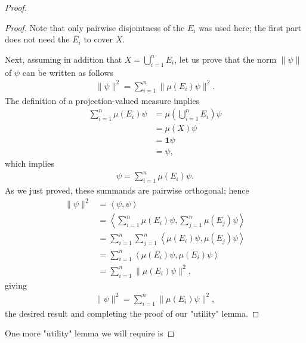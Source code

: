 \begin{proof}
\begin{proof}
Note that only pairwise disjointness of the $E_i$ was used here; the first part does not need the $E_i$ to cover $X$.

Next, assuming in addition that $X = \bigcup_{i = 1}^n E_i$, let us prove that the norm $\|\psi\|$ of $\psi$ can be written as follows
\begin{align}
    \|\psi\|^2 = \sum_{i = 1}^n \|\mu(E_i)\psi\|^2.
\end{align}
The definition of a projection-valued measure implies
\begin{align}
    \sum_{i = 1}^n \mu(E_i) \psi &= \mu \left( \bigcup_{i = 1}^n E_i \right) \psi \\
                                 &= \mu \left( X  \right) \psi \\
                                 &= \mathbf{1} \psi \\
                                 &= \psi,
\end{align}
which implies
\begin{align}
    \psi = \sum_{i = 1}^n \mu(E_i) \psi.
\end{align}
As we just proved, these summands are pairwise orthogonal; hence
\begin{align}
    \| \psi \|^2 &= \left< \psi, \psi \right> \\
                 &= \left< \sum_{i = 1}^n \mu(E_i) \psi, \sum_{j = 1}^n \mu(E_j) \psi \right> \\
                 &= \sum_{i = 1}^n \sum_{j = 1}^n \left< \mu(E_i) \psi, \mu(E_j) \psi \right> \\
                 &= \sum_{i = 1}^n \left< \mu(E_i) \psi, \mu(E_i) \psi \right> \\
                 &= \sum_{i = 1}^n \|\mu(E_i) \psi\|^2,
\end{align}
giving
\begin{align}
    \| \psi \|^2 = \sum_{i = 1}^n \|\mu(E_i) \psi\|^2,
\end{align}
the desired result and completing the proof of our "utility" lemma.
\end{proof}

One more "utility" lemma we will require is


\end{proof}
